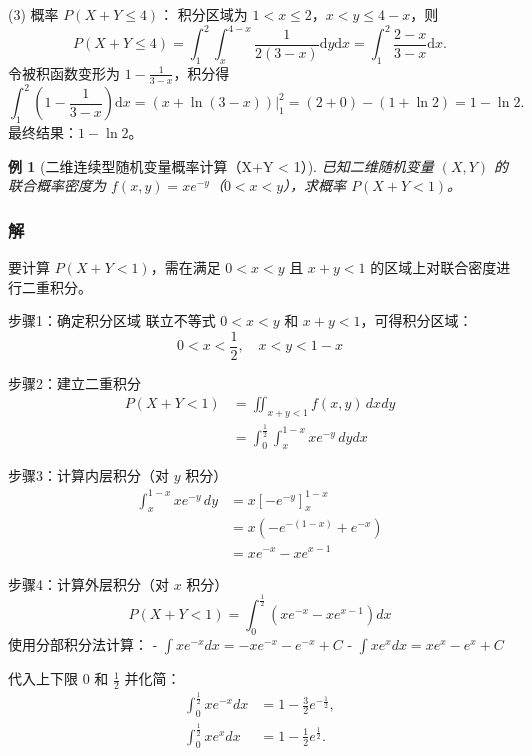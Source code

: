 \documentclass{book}
\newtheorem{example}{例}[subsection]
\begin{document}
(3) 概率 $P(X + Y \leq 4)$：
积分区域为 $1<x\le2$，$x<y\le4-x$，则
\[
P(X + Y \leq 4) = \int_{1}^{2} \int_{x}^{4-x} \frac{1}{2(3-x)} \mathrm{d}y \mathrm{d}x = \int_{1}^{2} \frac{2-x}{3-x} \mathrm{d}x.
\]
令被积函数变形为 $1 - \frac{1}{3-x}$，积分得
\[
\int_{1}^{2} \left(1 - \frac{1}{3-x}\right) \mathrm{d}x = \left. \left(x + \ln(3-x)\right) \right|_{1}^{2} = (2 + 0) - (1 + \ln2) = 1 - \ln2.
\]
最终结果：$\boxed{1 - \ln2}$。

\begin{example}[二维连续型随机变量概率计算（X+Y < 1）]
已知二维随机变量 $(X,Y)$ 的联合概率密度为 $f(x,y) = x e^{-y}$（$0 < x < y$），求概率 $P(X+Y < 1)$。
\end{example}

\subsubsection{解}
要计算 $P(X+Y < 1)$，需在满足 $0 < x < y$ 且 $x + y < 1$ 的区域上对联合密度进行二重积分。

步骤1：确定积分区域
联立不等式 $0 < x < y$ 和 $x + y < 1$，可得积分区域：
\[
0 < x < \frac{1}{2}, \quad x < y < 1 - x
\]

步骤2：建立二重积分
\[
\begin{aligned}
P(X+Y < 1) &= \iint_{x+y<1} f(x,y) \, dxdy \\
&= \int_{0}^{\frac{1}{2}} \int_{x}^{1-x} x e^{-y} \, dy dx
\end{aligned}
\]

步骤3：计算内层积分（对 $y$ 积分）
\[
\begin{aligned}
\int_{x}^{1-x} x e^{-y} \, dy &= x \left[ -e^{-y} \right]_{x}^{1-x} \\
&= x \left( -e^{-(1-x)} + e^{-x} \right) \\
&= x e^{-x} - x e^{x-1}
\end{aligned}
\]

步骤4：计算外层积分（对 $x$ 积分）
\[
P(X+Y < 1) = \int_{0}^{\frac{1}{2}} \left( x e^{-x} - x e^{x-1} \right) dx
\]
使用分部积分法计算：
- $\int x e^{-x} dx = -x e^{-x} - e^{-x} + C$
- $\int x e^{x} dx = x e^{x} - e^{x} + C$

代入上下限 $0$ 和 $\frac{1}{2}$ 并化简：
\[
\begin{aligned}
\int_{0}^{\frac{1}{2}} x e^{-x} dx &= 1 - \frac{3}{2} e^{-\frac{1}{2}}, \\
\int_{0}^{\frac{1}{2}} x e^{x} dx &= 1 - \frac{1}{2} e^{\frac{1}{2}}.
\end{aligned}
\]
\end{document}
